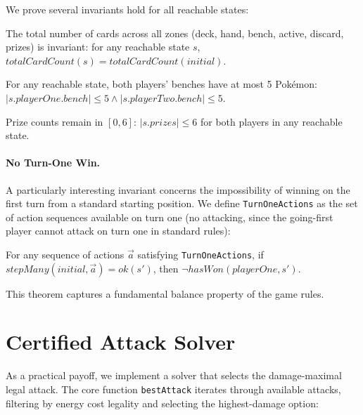 \documentclass[a4paper,UKenglish,cleveref,autoref,anonymous]{lipics-v2021}
\begin{document}
\noindent We prove several invariants hold for all reachable states:

\begin{theorem}
The total number of cards across all zones (deck, hand, bench, active, discard, prizes) is invariant: for any reachable state $s$, $\mathit{totalCardCount}(s) = \mathit{totalCardCount}(\mathit{initial})$.
\end{theorem}

\begin{theorem}
For any reachable state, both players' benches have at most 5 Pok\'emon: $|s.\mathit{playerOne}.\mathit{bench}| \leq 5 \land |s.\mathit{playerTwo}.\mathit{bench}| \leq 5$.
\end{theorem}

\begin{theorem}
Prize counts remain in $[0, 6]$: $|s.\mathit{prizes}| \leq 6$ for both players in any reachable state.
\end{theorem}

\paragraph{No Turn-One Win.}
A particularly interesting invariant concerns the impossibility of winning on the first turn from a standard starting position.
We define \texttt{TurnOneActions} as the set of action sequences available on turn one (no attacking, since the going-first player cannot attack on turn one in standard rules):

\begin{theorem}
For any sequence of actions $\vec{a}$ satisfying \texttt{TurnOneActions}, if $\mathit{stepMany}(\mathit{initial}, \vec{a}) = \mathit{ok}(s')$, then $\neg\mathit{hasWon}(\mathit{playerOne}, s')$.
\end{theorem}

This theorem captures a fundamental balance property of the game rules.

\section{Certified Attack Solver}
\label{sec:solver}

As a practical payoff, we implement a solver that selects the damage-maximal legal attack.
The core function \texttt{bestAttack} iterates through available attacks, filtering by energy cost legality and selecting the highest-damage option:
\end{document}
